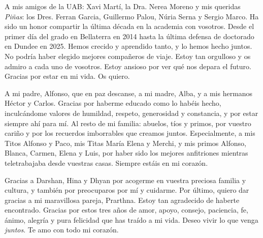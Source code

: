 A mis amigos de la UAB: Xavi Martí, la Dra. Nerea Moreno y mis queridas \textit{Piñas}: los Dres. Ferran Garcia, Guillermo Palou, Núria Serna y Sergio Marco. Ha sido un honor compartir la última década en la academia con vosotros. Desde el primer día del grado en Bellaterra en 2014 hasta la última defensa de doctorado en Dundee en 2025. Hemos crecido y aprendido tanto, y lo hemos hecho juntos. No podría haber elegido mejores compañeros de viaje. Estoy tan orgulloso y os admiro a cada uno de vosotros. Estoy ansioso por ver qué nos depara el futuro. Gracias por estar en mi vida. Os quiero.

A mi padre, Alfonso, que en paz descanse, a mi madre, Alba, y a mis hermanos Héctor y Carlos. Gracias por haberme educado como lo habéis hecho, inculcándome valores de humildad, respeto, generosidad y constancia, y por estar siempre ahí para mí. Al resto de mi familia: abuelos, tíos y primos, por vuestro cariño y por los recuerdos imborrables que creamos juntos. Especialmente, a mis Titos Alfonso y Paco, mis Titas María Elena y Merchi, y mis primos Alfonso, Blanca, Carmen, Elena y Luis, por haber sido los mejores anfitriones mientras teletrabajaba desde vuestras casas. Siempre estáis en mi corazón.

Gracias a Darshan, Hina y Dhyan por acogerme en vuestra preciosa familia y cultura, y también por preocuparos por mí y cuidarme. Por último, quiero dar gracias a mi maravillosa pareja, Prarthna. Estoy tan agradecido de haberte encontrado. Gracias por estos tres años de amor, apoyo, consejo, paciencia, fe, ánimo, alegría y pura felicidad que has traído a mi vida. Deseo vivir lo que venga \textit{juntos}. Te amo con todo mi corazón.